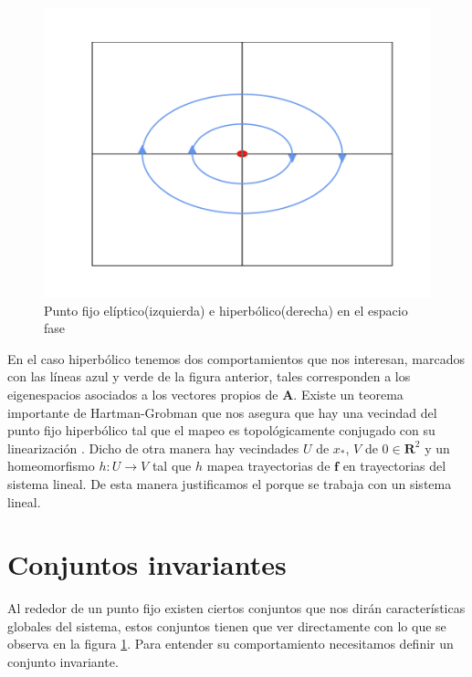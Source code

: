 \begin{figure}[h!]
\centering
\includegraphics[scale=0.3]{hyperbolic} 
\caption{Punto fijo elíptico(izquierda) e hiperbólico(derecha) en el espacio fase}\label{hiperbolic}
\end{figure}



En el caso hiperbólico tenemos dos comportamientos que nos interesan, marcados con las líneas azul y verde de la figura anterior, tales corresponden a los eigenespacios asociados a los vectores propios de $\mathbf{A}$. Existe un teorema importante de Hartman-Grobman que nos asegura que hay una vecindad del punto fijo hiperbólico tal que el mapeo es topológicamente conjugado con su linearización \cite{Meiss,Meyer,Juergen}. Dicho de otra manera hay vecindades $U$ de $x_{*}$, $V$ de $0 \in \mathbf{R}^{2}$ y un homeomorfismo $h:U\rightarrow V$ tal que $h$ mapea trayectorias de $\mathbf{f}$ en trayectorias del sistema lineal. De esta manera justificamos el porque se trabaja con un sistema lineal.



\section{Conjuntos invariantes}
Al rededor de un punto fijo existen ciertos conjuntos que nos dirán características globales del sistema, estos conjuntos tienen que ver directamente con lo que se observa en la figura \ref{hiperbolic}. Para entender su comportamiento necesitamos definir un conjunto invariante.

